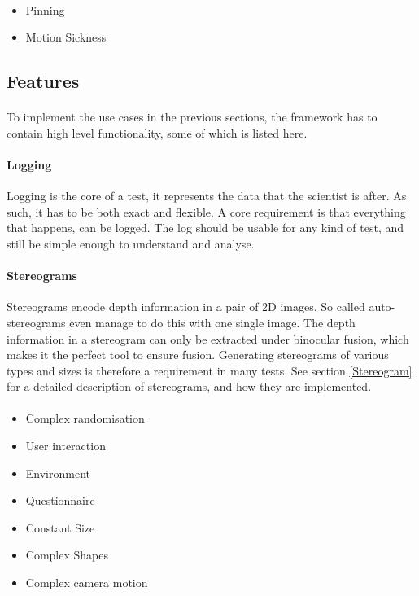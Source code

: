 \paragraph{}

\begin{itemize}
\item Pinning
\item Motion Sickness
\end{itemize}

\subsection{Features}
\paragraph{}
To implement the use cases in the previous sections, the framework has to contain high level functionality, some of which is listed here.

\paragraph{Logging}
Logging is the core of a test, it represents the data that the scientist is after.
As such, it has to be both exact and flexible.
A core requirement is that everything that happens, can be logged.
The log should be usable for any kind of test, and still be simple enough to understand and analyse.

\paragraph{Stereograms}
Stereograms encode depth information in a pair of 2D images.
So called auto-stereograms even manage to do this with one single image.
The depth information in a stereogram can only be extracted under binocular fusion, which makes it the perfect tool to ensure fusion.
Generating stereograms of various types and sizes is therefore a requirement in many tests.
See section \ref{Stereogram} for a detailed description of stereograms, and how they are implemented.

\paragraph{}

\begin{itemize}
\item Complex randomisation
\item User interaction
\item Environment
\item Questionnaire
\item Constant Size
\item Complex Shapes
\item Complex camera motion
\end{itemize}

